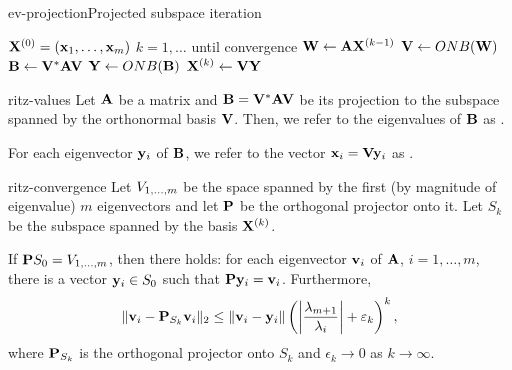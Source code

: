\begin{Algorithm*}{ev-projection}{Projected subspace iteration}
  \begin{algorithmic}[1]
    \Require $\matx^{(0)} = (\vx_1,\dots,\vx_m)$
    \For $k=1,\dots$ until convergence
    \State $\matw \gets \mata\matx^{(k-1)}$
    \State $\matv \gets ONB(\matw)$
    \State $\matb \gets \matv^*\mata\matv$
    \State $\maty \gets ONB(\matb)$
    \State $\matx^{(k)} \gets \matv\maty$
    \EndFor
  \end{algorithmic}
\end{Algorithm*}

\begin{Definition}{ritz-values}
  Let $\mata$ be a matrix and $\matb = \matv^*\mata\matv$ be its
  projection to the subspace spanned by the orthonormal basis
  $\matv$. Then, we refer to the eigenvalues of $\matb$ as
  .

  For each eigenvector $\vy_i$ of $\matb$, we refer to the vector
  $\vx_i = \matv\vy_i$ as .
\end{Definition}

\begin{Theorem}{ritz-convergence}
  Let $\esp{1,\dots,m}$ be the space spanned by the first (by
  magnitude of eigenvalue) $m$ eigenvectors and let $\matp$ be the
  orthogonal projector onto it. Let $S_k$ be the subspace spanned by
  the basis $\matx^{(k)}$.
  
  If $\matp S_0 = \esp{1,\dots,m}$, then there holds: for each
  eigenvector $\vv_i$ of $\mata$, $i=1,\dots,m$, there is a vector
  $\vy_i\in S_0$ such that $\matp\vy_i = \vv_i$. Furthermore,
  \begin{gather}
    \norm{\vv_i - \matp_{S_k} \vv_i}_2 \le \norm{\vv_i-\vy_i}
    \left(\abs*{\frac{\lambda_{m+1}}{\lambda_i}}+\epsilon_k\right)^k,
  \end{gather}
  where $\matp_{S_k}$ is the orthogonal projector onto $S_k$ and
  $\epsilon_k\to 0$ as $k \to \infty$.
\end{Theorem}

